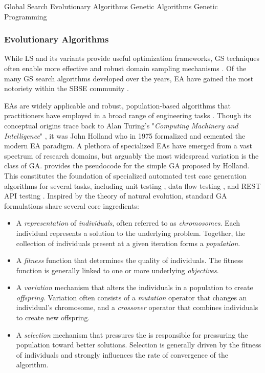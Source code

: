  {Global Search}
 {Evolutionary Algorithms}
 {Genetic Algorithms}
 {Genetic Programming}

\subsubsection{Evolutionary Algorithms}

While \gls{LS} and its variants
provide useful optimization frameworks, \Gls{GS} techniques often
enable more effective and robust domain sampling mechanisms \cite{mcminn2004search}.
Of the many \gls{GS} search algorithms developed over the years, \Gls{EA} have gained
the most notoriety within the \gls{SBSE} community \cite{harman2011software}.

\gls{EA}s are widely applicable and robust, population-based algorithms
that practitioners have employed in a broad range of engineering tasks \cite{harman2011software}.
Though its conceptual origins trace back to Alan Turing's "\textit{Computing Machinery and Intelligence}" \cite{turing1950computing}, it was John Holland \cite{jh1975adaptation}
who in 1975 formalized and cemented the modern \gls{EA} paradigm.
A plethora of specialized \gls{EA}s have emerged from a vast spectrum of 
research domains, but arguably the most widespread variation is the
class of \Gls{GA}.
 provides the pseudocode for the simple \gls{GA}
proposed by Holland.
This constitutes the foundation of specialized automated test case generation algorithms
for several tasks, including unit testing 
\cite{tonella2004evolutionary, panichella2017automated},
data flow testing \cite{girgis2005automatic}, and REST API testing
\cite{arcuri2019restful}.
Inspired by the theory of natural evolution,
standard \gls{GA} formulations share several core ingredients:
\begin{itemize}
\item A \textit{representation} of \textit{individuals},
	often referred to as \textit{chromosomes}.
	Each individual represents a solution to the underlying
	problem.
	Together, the collection of individuals present at
	a given iteration forms a \textit{population}.

\item A \textit{fitness} function that determines
	the quality of individuals. 
	The fitness function is generally linked
	to one or more underlying \textit{objectives}.

\item A \textit{variation} mechanism that alters
	the individuals in a population to create \textit{offspring}.
	Variation often consists of a \textit{mutation} operator
	that changes an individual's chromosome, and a \textit{crossover}
	operator that combines individuals to create new offspring.
	
\item A \textit{selection} mechanism that pressures the is responsible
	for pressuring the population toward better solutions. Selection
	is generally driven by the fitness of individuals and strongly
	influences the rate of convergence of the algorithm.
\end{itemize}

